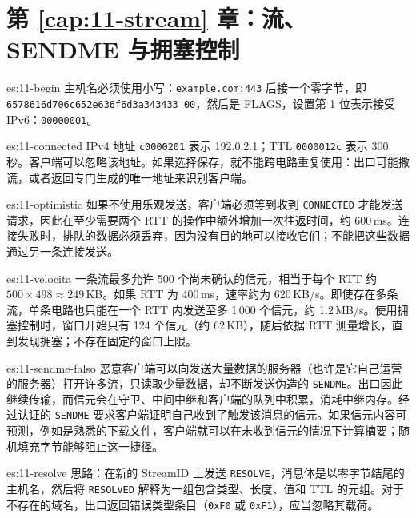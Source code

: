 \section*{第 \ref{cap:11-stream} 章：流、SENDME 与拥塞控制}

\begin{soluzione}{es:11-begin}
主机名必须使用小写：\texttt{example.com:443} 后接一个零字节，即 \texttt{6578616d706c652e\allowbreak 636f6d3a343433 00}，然后是 FLAGS，设置第 1 位表示接受 IPv6：\texttt{00000001}。
\end{soluzione}

\begin{soluzione}{es:11-connected}
IPv4 地址 \texttt{c0000201} 表示 192.0.2.1；TTL \texttt{0000012c} 表示 300 秒。客户端可以忽略该地址。如果选择保存，就不能跨电路重复使用：出口可能撒谎，或者返回专门生成的唯一地址来识别客户端。
\end{soluzione}

\begin{soluzione}{es:11-optimistic}
如果不使用乐观发送，客户端必须等到收到 \texttt{CONNECTED} 才能发送请求，因此在至少需要两个 RTT 的操作中额外增加一次往返时间，约 600\,ms。连接失败时，排队的数据必须丢弃，因为没有目的地可以接收它们；不能把这些数据通过另一条连接发送。
\end{soluzione}

\begin{soluzione}{es:11-velocita}
一条流最多允许 500 个尚未确认的信元，相当于每个 RTT 约 $500\times498\approx249$\,KB。如果 RTT 为 400\,ms，速率约为 620\,KB/s。即使存在多条流，单条电路也只能在一个 RTT 内发送至多 1\,000 个信元，约 1.2\,MB/s。使用拥塞控制时，窗口开始只有 124 个信元（约 62\,KB），随后依据 RTT 测量增长，直到发现拥塞；不存在固定的窗口上限。
\end{soluzione}

\begin{soluzione}{es:11-sendme-falso}
恶意客户端可以向发送大量数据的服务器（也许是它自己运营的服务器）打开许多流，只读取少量数据，却不断发送伪造的 \texttt{SENDME}。出口因此继续传输，而信元会在守卫、中间中继和客户端的队列中积累，消耗中继内存。经过认证的 \texttt{SENDME} 要求客户端证明自己收到了触发该消息的信元。如果信元内容可预测，例如是熟悉的下载文件，客户端就可以在未收到信元的情况下计算摘要；随机填充字节能够阻止这一捷径。
\end{soluzione}

\begin{soluzione}{es:11-resolve}
思路：在新的 StreamID 上发送 \texttt{RESOLVE}，消息体是以零字节结尾的主机名，然后将 \texttt{RESOLVED} 解释为一组包含类型、长度、值和 TTL 的元组。对于不存在的域名，出口返回错误类型条目（\texttt{0xF0} 或 \texttt{0xF1}），应当忽略其载荷。
\end{soluzione}

